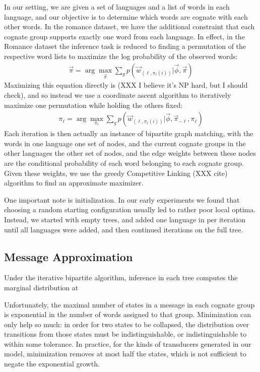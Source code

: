 \documentclass[11pt,a4paper]{article}
\begin{document}
In our setting, we are given a set of languages and a list of words
in each language, and our objective is to determine which words are
cognate with each other words. In the romance dataset, we have the
additional constraint that each cognate group supports exactly one
word from each language. In effect, in the Romance dataset the 
inference task is reduced to finding a permutation of the respective
word lists to maximize the log probability of the observed words:
\begin{equation}
  \begin{split}
    \vec{\pi} = \arg\!\max_{\vec \pi} \sum_{g} p(\vec w_{(\ell,\pi_\ell(i))}|\vec \phi,\vec \pi)
   \end{split}
 \end{equation}
Maximizing this equation directly is (XXX I believe it's NP hard,
but I should check), and so instead we use a coordinate ascent
algorithm to iteratively maximize one permutation while holding the
others fixed:
\begin{equation}
  \begin{split}
    \pi_\ell = \arg\!\max_{\pi_\ell} \sum_{g} p(\vec w_{(\ell,\pi_\ell(i))}|\vec \phi,\vec \pi_{-\ell},\pi_\ell)
  \end{split}
\end{equation}
Each iteration is then actually an instance of bipartite graph
matching, with the words in one language one set of nodes, and the
current cognate groups in the other languages the other set of
nodes, and the edge weights between these nodes are the conditional
probability of each word belonging to each cognate group. Given these
weights, we use the greedy Competitive Linking (XXX cite) algorithm
to find an approximate maximizer.

One important note is initialization. In our early experiments we
found that choosing a random starting configuration usually led to
rather poor local optima. Instead, we started with empty trees, and
added one language in per iteration until all languages were added,
and then continued iterations on the full tree.

\subsection{Message Approximation}

Under the iterative bipartite algorithm, inference in each tree
computes the marginal distribution at

Unfortunately, the maximal number of states in a message in each
cognate group is exponential in the number of words assigned to
that group. Minimization can only help so much: in order for two
states to be collapsed, the distribution over transitions from those
states must be indistinguishable, or indistinguishable to within
some tolerance. In practice, for the kinds of transducers generated
in our model, minimization removes at most half the states, which is
not sufficient to negate the exponential growth.
\end{document}
